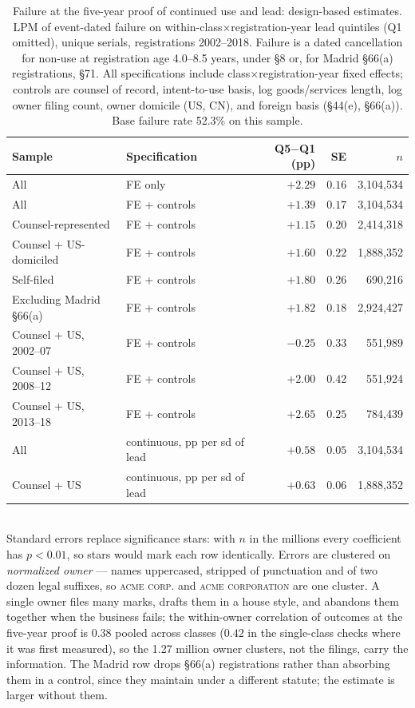 \begin{table}[!htbp]\centering\small
\caption{Failure at the five-year proof of continued use and lead:
design-based estimates. LPM of event-dated failure on
within-class$\times$registration-year lead quintiles (Q1 omitted), unique
serials, registrations 2002--2018. Failure is a dated cancellation for
non-use at registration age 4.0--8.5 years, under \S8 or, for Madrid
\S66(a) registrations, \S71. All specifications include
class$\times$registration-year fixed effects; controls are counsel of
record, intent-to-use basis, log goods/services length, log owner filing
count, owner domicile (US, CN), and foreign basis (\S44(e), \S66(a)).
Base failure rate 52.3\% on this sample.}
\label{tab:gate_lpm}
\begin{tabular}{llrrr}
\toprule
Sample & Specification & Q5$-$Q1 (pp) & SE & $n$ \\
\midrule
All & FE only & $+2.29$ & $0.16$ & 3{,}104{,}534 \\
All & FE + controls & $+1.39$ & $0.17$ & 3{,}104{,}534 \\
Counsel-represented & FE + controls & $+1.15$ & $0.20$ & 2{,}414{,}318 \\
Counsel + US-domiciled & FE + controls & $+1.60$ & $0.22$ & 1{,}888{,}352 \\
Self-filed & FE + controls & $+1.80$ & $0.26$ & 690{,}216 \\
Excluding Madrid \S66(a) & FE + controls & $+1.82$ & $0.18$ & 2{,}924{,}427 \\
\midrule
Counsel + US, 2002--07 & FE + controls & $-0.25$ & $0.33$ & 551{,}989 \\
Counsel + US, 2008--12 & FE + controls & $+2.00$ & $0.42$ & 551{,}924 \\
Counsel + US, 2013--18 & FE + controls & $+2.65$ & $0.25$ & 784{,}439 \\
\midrule
All & continuous, pp per sd of lead & $+0.58$ & $0.05$ & 3{,}104{,}534 \\
Counsel + US & continuous, pp per sd of lead & $+0.63$ & $0.06$ & 1{,}888{,}352 \\
\bottomrule
\end{tabular}
\\[0.3em]\footnotesize Standard errors replace significance stars: with
$n$ in the millions every coefficient has $p < 0.01$, so stars would mark
each row identically. Errors are clustered on \emph{normalized owner} ---
names uppercased, stripped of punctuation and of two dozen legal suffixes,
so \textsc{acme corp.} and \textsc{acme corporation} are one cluster. A
single owner files many marks, drafts them in a house style, and abandons
them together when the business fails; the within-owner correlation of
outcomes at the five-year proof is $0.38$ pooled across classes ($0.42$ in
the single-class checks where it was first measured), so the 1.27 million
owner clusters, not the filings, carry the information. The Madrid row
drops \S66(a) registrations rather than absorbing them in a control, since
they maintain under a different statute; the estimate is larger without
them.
\end{table}

